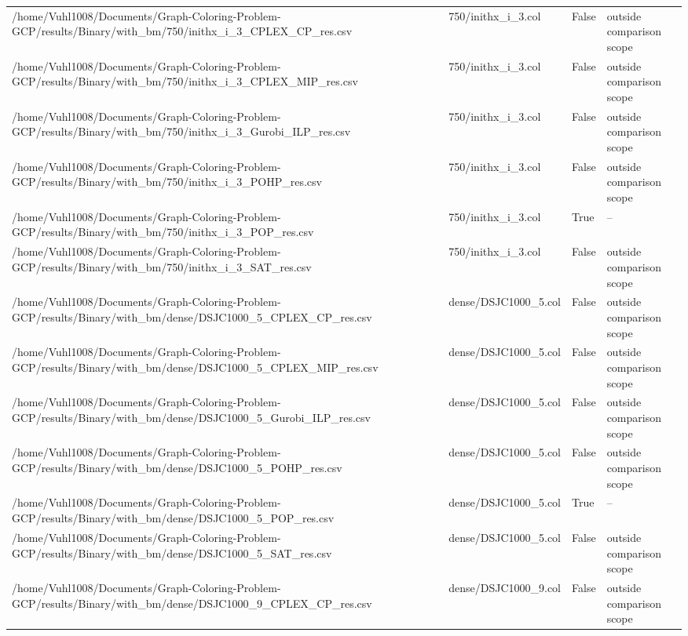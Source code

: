 \begin{table}[htbp]
\begin{tabular}{llll}
/home/Vuhl1008/Documents/Graph-Coloring-Problem-GCP/results/Binary/with\_bm/750/inithx\_i\_3\_CPLEX\_CP\_res.csv & 750/inithx\_i\_3.col & False & outside comparison scope \\
/home/Vuhl1008/Documents/Graph-Coloring-Problem-GCP/results/Binary/with\_bm/750/inithx\_i\_3\_CPLEX\_MIP\_res.csv & 750/inithx\_i\_3.col & False & outside comparison scope \\
/home/Vuhl1008/Documents/Graph-Coloring-Problem-GCP/results/Binary/with\_bm/750/inithx\_i\_3\_Gurobi\_ILP\_res.csv & 750/inithx\_i\_3.col & False & outside comparison scope \\
/home/Vuhl1008/Documents/Graph-Coloring-Problem-GCP/results/Binary/with\_bm/750/inithx\_i\_3\_POHP\_res.csv & 750/inithx\_i\_3.col & False & outside comparison scope \\
/home/Vuhl1008/Documents/Graph-Coloring-Problem-GCP/results/Binary/with\_bm/750/inithx\_i\_3\_POP\_res.csv & 750/inithx\_i\_3.col & True & -- \\
/home/Vuhl1008/Documents/Graph-Coloring-Problem-GCP/results/Binary/with\_bm/750/inithx\_i\_3\_SAT\_res.csv & 750/inithx\_i\_3.col & False & outside comparison scope \\
/home/Vuhl1008/Documents/Graph-Coloring-Problem-GCP/results/Binary/with\_bm/dense/DSJC1000\_5\_CPLEX\_CP\_res.csv & dense/DSJC1000\_5.col & False & outside comparison scope \\
/home/Vuhl1008/Documents/Graph-Coloring-Problem-GCP/results/Binary/with\_bm/dense/DSJC1000\_5\_CPLEX\_MIP\_res.csv & dense/DSJC1000\_5.col & False & outside comparison scope \\
/home/Vuhl1008/Documents/Graph-Coloring-Problem-GCP/results/Binary/with\_bm/dense/DSJC1000\_5\_Gurobi\_ILP\_res.csv & dense/DSJC1000\_5.col & False & outside comparison scope \\
/home/Vuhl1008/Documents/Graph-Coloring-Problem-GCP/results/Binary/with\_bm/dense/DSJC1000\_5\_POHP\_res.csv & dense/DSJC1000\_5.col & False & outside comparison scope \\
/home/Vuhl1008/Documents/Graph-Coloring-Problem-GCP/results/Binary/with\_bm/dense/DSJC1000\_5\_POP\_res.csv & dense/DSJC1000\_5.col & True & -- \\
/home/Vuhl1008/Documents/Graph-Coloring-Problem-GCP/results/Binary/with\_bm/dense/DSJC1000\_5\_SAT\_res.csv & dense/DSJC1000\_5.col & False & outside comparison scope \\
/home/Vuhl1008/Documents/Graph-Coloring-Problem-GCP/results/Binary/with\_bm/dense/DSJC1000\_9\_CPLEX\_CP\_res.csv & dense/DSJC1000\_9.col & False & outside comparison scope \\

\end{tabular}
\end{table}
